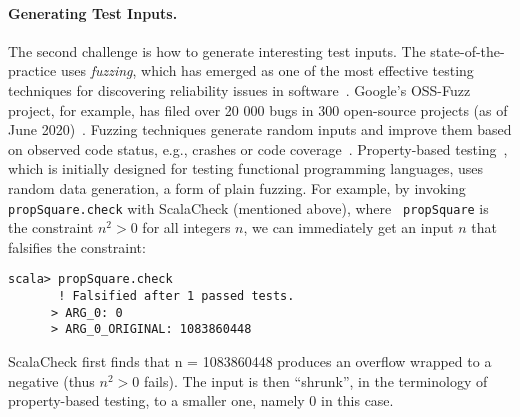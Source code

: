 \documentclass[fleqn,12pt]{article}
\begin{document}


\paragraph{Generating Test Inputs.}
The second challenge is how to generate interesting test inputs.  The
state-of-the-practice uses \emph{fuzzing}, which has emerged as one of
the most effective testing techniques for discovering reliability
issues in software~\cite{takanen2018fuzzing}.  Google's OSS-Fuzz
project, for example, has filed over 20 000 bugs in 300 open-source
projects (as of June 2020)~\cite{web:oss-fuzz}.  Fuzzing techniques
generate random inputs and improve them based on observed code status,
e.g., crashes or code
coverage~\cite{DBLP:journals/tse/BohmePR19,DBLP:conf/pldi/FuS17}.
Property-based testing~\cite{DBLP:conf/icfp/ClaessenH00}, which is
initially designed for testing functional programming languages, uses
random data generation, a form of plain fuzzing. For example, by
invoking {\tt propSquare.check} with ScalaCheck (mentioned above), where {\tt
  propSquare} is the constraint $n^2>0$ for all integers $n$, we can
immediately get an input $n$ that falsifies the constraint:

\begin{lstlisting}[numbers=none]
scala> propSquare.check
       ! Falsified after 1 passed tests.
      > ARG_0: 0
      > ARG_0_ORIGINAL: 1083860448
\end{lstlisting}
 ScalaCheck first finds that n = 1083860448 produces an overflow
 wrapped to a negative (thus $n^2>0$ fails). The input is then
 ``shrunk'', in the terminology of property-based testing, to a smaller
 one, namely 0 in this case.
\end{document}
